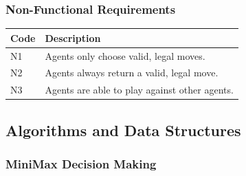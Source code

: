 \documentclass[12pt,a4paper]{article}
\begin{document}
    \subsubsection*{Non-Functional Requirements}

        
    \begin{center}
        \begin{tabular*}{1\textwidth}{| l | p{144.5mm} |}
        \hline
        Code & Description \\ \hline
        N1 & Agents only choose valid, legal moves. \\ \hline
        N2 & Agents always return a valid, legal move.\\ \hline
        N3 & Agents are able to play against other agents. \\ \hline
        \end{tabular*}
    \end{center}



\subsection*{Algorithms and Data Structures}

\subsubsection{MiniMax Decision Making}
\end{document}

